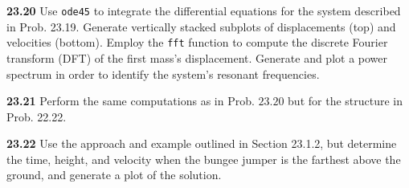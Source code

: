 \documentclass[../main.tex]{subfiles}
\begin{document}
\begin{multicols}{2}
    \noindent \textbf{23.20} Use \texttt{ode45} to integrate the differential equations for the system described    in Prob. 23.19. Generate vertically stacked subplots of displacements (top) and velocities (bottom). Employ    the \texttt{fft} function to compute the discrete Fourier transform (DFT) of the first mass's displacement.    Generate and plot a power spectrum in order to identify the system's resonant frequencies.\vspace{2mm}

    \noindent\textbf{23.21} Perform the same computations as in Prob. $23.20$ but for the structure in Prob. 22.22.

    \noindent\textbf{23.22} Use the approach and example outlined in Section 23.1.2, but determine the time, height, and velocity when the bungee jumper is the farthest above the ground, and generate a plot of the solution.

\end{multicols}
\end{document}

